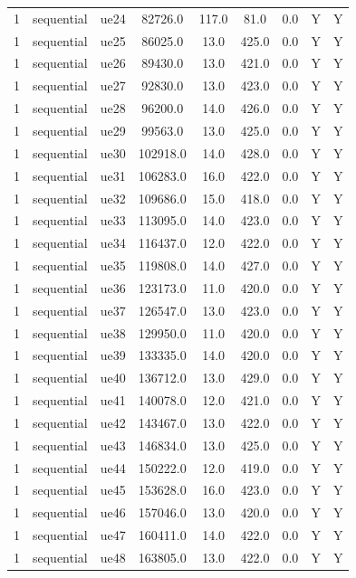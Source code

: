 \begin{table}[ht]
\begin{tabular}{|c|c|c|c|c|c|c|c|c|}
1 & sequential & ue24 & 82726.0 & 117.0 & 81.0 & 0.0 & Y & Y \\
1 & sequential & ue25 & 86025.0 & 13.0 & 425.0 & 0.0 & Y & Y \\
1 & sequential & ue26 & 89430.0 & 13.0 & 421.0 & 0.0 & Y & Y \\
1 & sequential & ue27 & 92830.0 & 13.0 & 423.0 & 0.0 & Y & Y \\
1 & sequential & ue28 & 96200.0 & 14.0 & 426.0 & 0.0 & Y & Y \\
1 & sequential & ue29 & 99563.0 & 13.0 & 425.0 & 0.0 & Y & Y \\
1 & sequential & ue30 & 102918.0 & 14.0 & 428.0 & 0.0 & Y & Y \\
1 & sequential & ue31 & 106283.0 & 16.0 & 422.0 & 0.0 & Y & Y \\
1 & sequential & ue32 & 109686.0 & 15.0 & 418.0 & 0.0 & Y & Y \\
1 & sequential & ue33 & 113095.0 & 14.0 & 423.0 & 0.0 & Y & Y \\
1 & sequential & ue34 & 116437.0 & 12.0 & 422.0 & 0.0 & Y & Y \\
1 & sequential & ue35 & 119808.0 & 14.0 & 427.0 & 0.0 & Y & Y \\
1 & sequential & ue36 & 123173.0 & 11.0 & 420.0 & 0.0 & Y & Y \\
1 & sequential & ue37 & 126547.0 & 13.0 & 423.0 & 0.0 & Y & Y \\
1 & sequential & ue38 & 129950.0 & 11.0 & 420.0 & 0.0 & Y & Y \\
1 & sequential & ue39 & 133335.0 & 14.0 & 420.0 & 0.0 & Y & Y \\
1 & sequential & ue40 & 136712.0 & 13.0 & 429.0 & 0.0 & Y & Y \\
1 & sequential & ue41 & 140078.0 & 12.0 & 421.0 & 0.0 & Y & Y \\
1 & sequential & ue42 & 143467.0 & 13.0 & 422.0 & 0.0 & Y & Y \\
1 & sequential & ue43 & 146834.0 & 13.0 & 425.0 & 0.0 & Y & Y \\
1 & sequential & ue44 & 150222.0 & 12.0 & 419.0 & 0.0 & Y & Y \\
1 & sequential & ue45 & 153628.0 & 16.0 & 423.0 & 0.0 & Y & Y \\
1 & sequential & ue46 & 157046.0 & 13.0 & 420.0 & 0.0 & Y & Y \\
1 & sequential & ue47 & 160411.0 & 14.0 & 422.0 & 0.0 & Y & Y \\
1 & sequential & ue48 & 163805.0 & 13.0 & 422.0 & 0.0 & Y & Y \\

\end{tabular}
\end{table}

